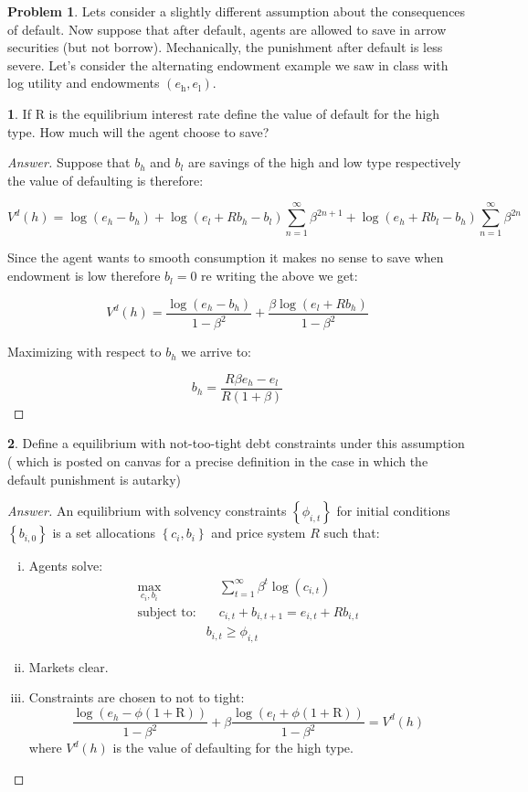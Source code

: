 \documentclass[12pt]{article}
\theoremstyle{definition}
\newtheorem{problem}{Problem}
\newtheorem{subproblem}{}[problem]
\begin{document}
\begin{problem}
Lets consider a slightly different assumption about the consequences of default. Now suppose that after default, agents are allowed to save in arrow securities (but not borrow). Mechanically, the punishment after default is less severe. Let's consider the alternating endowment example we saw in class with log utility and endowments
$\left(e_{\mathrm{h}}, e_{\mathrm{l}}\right)$.
\begin{subproblem}
If $\mathrm{R}$ is the equilibrium interest rate define the value of default for the high type. How much will the agent choose to save?
\end{subproblem}
\begin{proof}[Answer]
Suppose that $b_h$ and $b_l$ are savings of the high and low type respectively the value of defaulting is therefore:

$$V^{d}(h) = \log{(e_h-b_h)} + \log{(e_l+Rb_h - b_l)}\sum_{n=1}^{\infty}\beta^{2n+1} + \log{(e_h+Rb_l - b_h)}\sum_{n=1}^{\infty}\beta^{2n}$$

Since the agent wants to smooth consumption it makes no sense to save when endowment is low therefore $b_l = 0$ re writing the above we get:

$$V^{d}(h) =\frac{\log{(e_h-b_h)} }{1-\beta^2} + \frac{\beta\log{(e_l+R b_h)} }{1-\beta^2}$$

Maximizing with respect to $b_h$ we arrive to:

$$b_h = \frac{R\beta e_h - e_l}{R(1+\beta)}$$

\end{proof}

\begin{subproblem}
Define a equilibrium with not-too-tight debt constraints under this assumption (\cite{alvarez2000efficiency} which is posted on canvas for a precise definition in the case in which the default punishment is autarky)
\end{subproblem}
\begin{proof}[Answer]
An equilibrium with solvency constraints $\left\{\phi_{i,t}\right\}$ for initial conditions $\left\{b_{i, 0}\right\}$ is a set allocations $\left\{c_{i}, b_{i}\right\}$ and price system $R$ such that:
\begin{enumerate}[(i)]
    \item Agents solve:
    \begin{align*}
    \max_{c_i,b_i}&\quad\sum_{t=1}^{\infty}\beta^{t}\log{(c_{i,t})}    \\
    \text{subject to:} & \quad c_{i,t} + b_{i,t+1} = e_{i,t} + Rb_{i,t}\\
    & b_{i,t}\geq \phi_{i,t}
    \end{align*}
    \item Markets clear.
    \item Constraints are chosen to not to tight:
    $$
\frac{\log (e_h-\phi(1+\mathrm{R}))}{1-\beta^{2}}+\beta \frac{\log (e_l+\phi(1+\mathrm{R}))}{1-\beta^{2}}=V^{d}(h)
$$
where $V^{d}(h)$ is the value of defaulting for the high type.
\end{enumerate}
\end{proof}


\end{problem}
\end{document}
